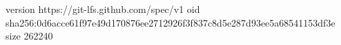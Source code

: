 version https://git-lfs.github.com/spec/v1
oid sha256:0d6acce61f97e49d170876ee2712926f3f837c8d5e287d93ee5a68541153df3e
size 262240
